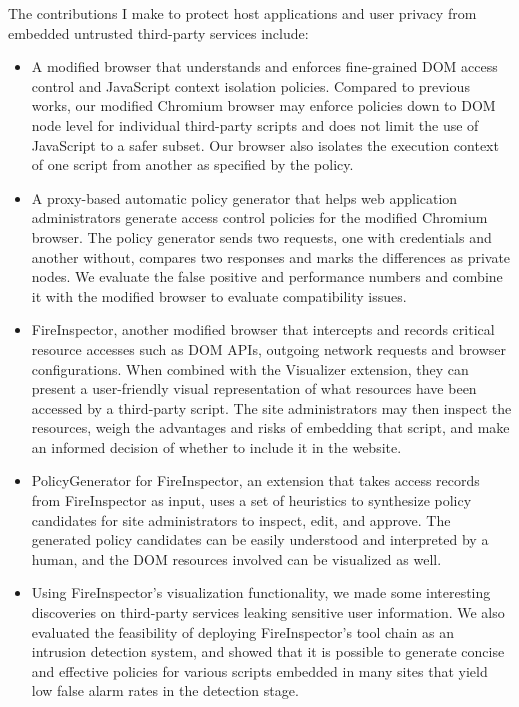 \vspace*{8pt}The contributions I make to protect host applications and user privacy from embedded untrusted third-party services include:

\begin{itemize}

\item A modified browser that understands and enforces fine-grained DOM access control and JavaScript context isolation policies.  Compared to previous works, our modified Chromium browser may enforce policies down to DOM node level for individual third-party scripts and does not limit the use of JavaScript to a safer subset.  Our browser also isolates the execution context of one script from another as specified by the policy.  

\item A proxy-based automatic policy generator that helps web application administrators generate access control policies for the modified Chromium browser.  The policy generator sends two requests, one with credentials and another without, compares two responses and marks the differences as private nodes.  We evaluate the false positive and performance numbers and combine it with the modified browser to evaluate compatibility issues.

\item FireInspector, another modified browser that intercepts and records critical resource accesses such as DOM APIs, outgoing network requests and browser configurations.  When combined with the Visualizer extension, they can present a user-friendly visual representation of what resources have been accessed by a third-party script.  The site administrators may then inspect the resources, weigh the advantages and risks of embedding that script, and make an informed decision of whether to include it in the website.

\item PolicyGenerator for FireInspector, an extension that takes access records from FireInspector as input, uses a set of heuristics to synthesize policy candidates for site administrators to inspect, edit, and approve.  The generated policy candidates can be easily understood and interpreted by a human, and the DOM resources involved can be visualized as well.

\item Using FireInspector's visualization functionality, we made some interesting discoveries on third-party services leaking sensitive user information.  We also evaluated the feasibility of deploying FireInspector's tool chain as an intrusion detection system, and showed that it is possible to generate concise and effective policies for various scripts embedded in many sites that yield low false alarm rates in the detection stage.

\end{itemize}